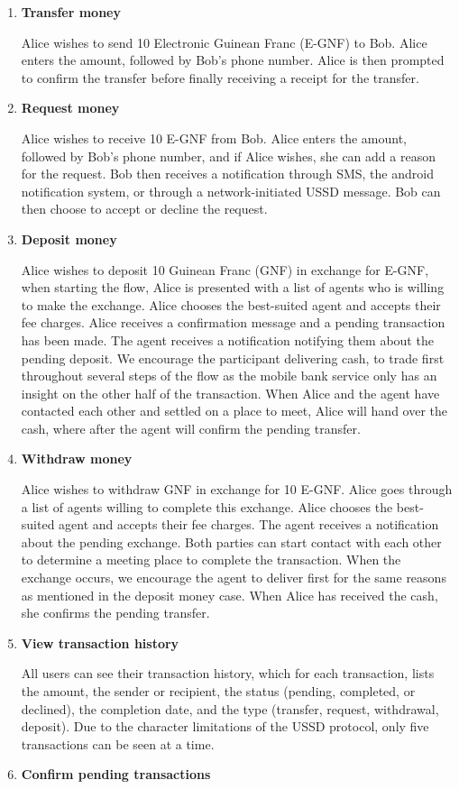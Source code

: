 \documentclass[11pt, a4paper]{article}
\begin{document}
\begin{enumerate}
  \item \textbf{Transfer money}

  Alice wishes to send 10 Electronic Guinean Franc (E-GNF) to Bob. Alice enters the amount, followed by Bob's phone number. Alice is then prompted to confirm the transfer before finally receiving a receipt for the transfer.
  \item \textbf{Request money}

  Alice wishes to receive 10 E-GNF from Bob. Alice enters the amount, followed by Bob's phone number, and if Alice wishes, she can add a reason for the request. Bob then receives a notification through SMS, the android notification system, or through a network-initiated USSD message. Bob can then choose to accept or decline the request.
  \item \textbf{Deposit money}

  Alice wishes to deposit 10 Guinean Franc (GNF) in exchange for E-GNF, when starting the flow, Alice is presented with a list of agents who is willing to make the exchange. Alice chooses the best-suited agent and accepts their fee charges. Alice receives a confirmation message and a pending transaction has been made. The agent receives a notification notifying them about the pending deposit. We encourage the participant delivering cash, to trade first throughout several steps of the flow as the mobile bank service only has an insight on the other half of the transaction. When Alice and the agent have contacted each other and settled on a place to meet, Alice will hand over the cash, where after the agent will confirm the pending transfer.
  \item \textbf{Withdraw money}

  Alice wishes to withdraw GNF in exchange for 10 E-GNF. Alice goes through a list of agents willing to complete this exchange. Alice chooses the best-suited agent and accepts their fee charges. The agent receives a notification about the pending exchange. Both parties can start contact with each other to determine a meeting place to complete the transaction. When the exchange occurs, we encourage the agent to deliver first for the same reasons as mentioned in the deposit money case. When Alice has received the cash, she confirms the pending transfer.
  \item \textbf{View transaction history}

  All users can see their transaction history, which for each transaction, lists the amount, the sender or recipient, the status (pending, completed, or declined), the completion date, and the type (transfer, request, withdrawal, deposit). Due to the character limitations of the USSD protocol, only five transactions can be seen at a time.
  \item \textbf{Confirm pending transactions}


\end{enumerate}
\end{document}
